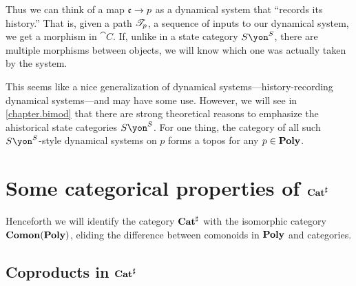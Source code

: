 \documentclass[Book-Poly]{subfiles}
\begin{document}
Thus we can think of a map $\mathfrak{c}\to p$ as a dynamical system that ``records its history.'' That is, given a path $\mathscr{T}_{p}$, a sequence of inputs to our dynamical system, we get a morphism in $\cat{C}$. If, unlike in a state category $S\yon^S$, there are multiple morphisms between objects, we will know which one was actually taken by the system.

This seems like a nice generalization of dynamical systems---history-recording dynamical systems---and may have some use. However, we will see in \cref{chapter.bimod} that there are strong theoretical reasons to emphasize the ahistorical state categories $S\yon^S$. For one thing, the category of all such $S\yon^S$-style dynamical systems on $p$ forms a topos for any $p\in\mathbf{Poly}$.






\section{Some categorical properties of $\mathbf{Cat}^\sharp$} %
Henceforth we will identify the category $\mathbf{Cat}^\sharp$ with the isomorphic category $\mathbf{Comon}(\mathbf{Poly})$, eliding the difference between comonoids in $\mathbf{Poly}$ and categories.


\subsection{Coproducts in $\mathbf{Cat}^\sharp$}
\end{document}
